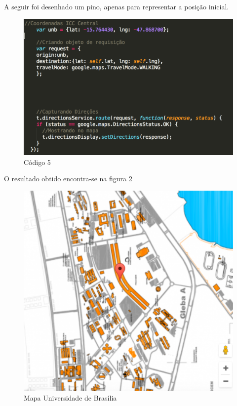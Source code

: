 A seguir foi desenhado um pino, apenas para representar a posição inicial.

\graphicspath{{figuras/}}
\begin{figure}[h!]
\centering
\includegraphics[scale=0.80]{codigo5}
\caption{Código 5}
\label{img:codigo5}
\end{figure}

O resultado obtido encontra-se na figura \ref{img:mapa_unb}

\graphicspath{{figuras/}}
\begin{figure}[h!]
\centering
\includegraphics[scale=0.80]{mapa_unb_1}
\caption{Mapa Universidade de Brasília}
\label{img:mapa_unb}
\end{figure}

